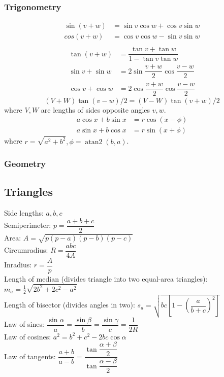 \subsubsection{Trigonometry}
\begin{align*}
\sin(v+w)&{}=\sin v\cos w+\cos v\sin w\\
cos(v+w)&{}=\cos v\cos w-\sin v\sin w\\
\end{align*}
\begin{align*}
\tan(v+w)&{}=\dfrac{\tan v+\tan w}{1-\tan v\tan w}\\
\sin v+\sin w&{}=2\sin\dfrac{v+w}{2}\cos\dfrac{v-w}{2}\\
\cos v+\cos w&{}=2\cos\dfrac{v+w}{2}\cos\dfrac{v-w}{2}
\end{align*}
\[ (V+W)\tan(v-w)/2{}=(V-W)\tan(v+w)/2 \]
where $V, W$ are lengths of sides opposite angles $v, w$.
\begin{align*}
	a\cos x+b\sin x&=r\cos(x-\phi)\\
	a\sin x+b\cos x&=r\sin(x+\phi)
\end{align*}
where $r=\sqrt{a^2+b^2}, \phi=\operatorname{atan2}(b,a)$.

\subsubsection{Geometry}

\subsection{Triangles}
Side lengths: $a,b,c$\\
Semiperimeter: $p=\dfrac{a+b+c}{2}$\\
Area: $A=\sqrt{p(p-a)(p-b)(p-c)}$\\
Circumradius: $R=\dfrac{abc}{4A}$\\
Inradius: $r=\dfrac{A}{p}$\\
Length of median (divides triangle into two equal-area triangles): $m_a=\tfrac{1}{2}\sqrt{2b^2+2c^2-a^2}$\\
Length of bisector (divides angles in two): $s_a=\sqrt{bc\left[1-\left(\dfrac{a}{b+c}\right)^2\right]}$\\
Law of sines: $\dfrac{\sin\alpha}{a}=\dfrac{\sin\beta}{b}=\dfrac{\sin\gamma}{c}=\dfrac{1}{2R}$\\
Law of cosines: $a^2=b^2+c^2-2bc\cos\alpha$\\
Law of tangents: $\dfrac{a+b}{a-b}=\dfrac{\tan\dfrac{\alpha+\beta}{2}}{\tan\dfrac{\alpha-\beta}{2}}$\\

